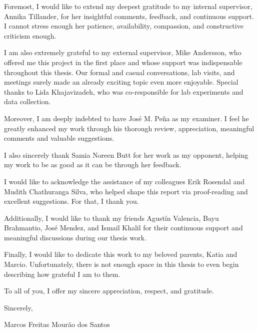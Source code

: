 
Foremost, I would like to extend my deepest gratitude to my internal supervisor, Annika Tillander, for her insightful comments, feedback, and continuous support. I cannot stress enough her patience, availability, compassion, and constructive criticism enough.

I am also extremely grateful to my external supervisor, Mike Andersson, who offered me this project in the first place and whose support was indispensable throughout this thesis. Our formal and casual conversations, lab visits, and meetings surely made an already exciting topic even more enjoyable. Special thanks to Lida Khajavizadeh, who was co-responsible for lab experiments and data collection.

Moreover, I am deeply indebted to have José M. Peña as my examiner. I feel he greatly enhanced my work through his thorough review, appreciation, meaningful comments and valuable suggestions.

I also sincerely thank Samia Noreen Butt for her work as my opponent, helping my work to be as good as it can be through her feedback.

I would like to acknowledge the assistance of my colleagues Erik Rosendal and Mudith Chathuranga Silva, who helped shape this report via proof-reading and excellent suggestions. For that, I thank you.

Additionally, I would like to thank my friends Agustín Valencia, Bayu Brahmantio, José Mendez, and Ismail Khalil for their continuous support and meaningful discussions during our thesis work.

Finally, I would like to dedicate this work to my beloved parents, Katia and Marcio. Unfortunately, there is not enough space in this thesis to even begin describing how grateful I am to them.

To all of you, I offer my sincere appreciation, respect, and gratitude.

\null\hfill Sincerely,

\null\hfill Marcos Freitas Mourão dos Santos




